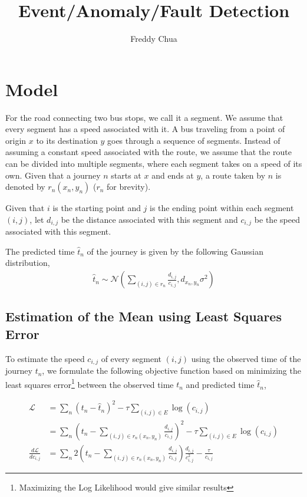 \documentclass[10pt]{article}
\begin{document}
\author{Freddy Chua}
\title{Event/Anomaly/Fault Detection}

\maketitle

\section{Model}

For the road connecting two bus stops, we call it a segment. We assume that every segment has a speed associated with it. A bus traveling from a point of origin $x$ to its destination $y$ goes through a sequence of segments. Instead of assuming a constant speed associated with the route, we assume that the route can be divided into multiple segments, where each segment takes on a speed of its own. Given that a journey $n$ starts at $x$ and ends at $y$, a route taken by $n$ is denoted by $r_n(x_n, y_n)$ ($r_n$ for brevity).

Given that $i$ is the starting point and $j$ is the ending point within each segment $(i, j)$, let $d_{i,j}$ be the distance associated with this segment and $c_{i,j}$ be the speed associated with this segment.

The predicted time $\hat{t}_n$ of the journey is given by the following Gaussian distribution,
\begin{gather}
\hat{t}_n \sim \mathcal{N} \left( \sum_{ (i,j) \in r_n } \frac{ d_{i,j} }{ c_{i,j} }, d_{x_n, y_n} \sigma^2 \right)
\end{gather}

\subsection{Estimation of the Mean using Least Squares Error}

To estimate the speed $c_{i,j}$ of every segment $(i,j)$ using the observed time of the journey $t_n$, we formulate the following objective function based on minimizing the least squares error\footnote{Maximizing the Log Likelihood would give similar results} between the observed time $t_n$ and predicted time $\hat{t}_n$,

\begin{align*}
\mathcal{L} &= \sum_{n} \left( t_n - \hat{t}_n \right)^2 - \tau \sum_{(i,j) \in E} \log(c_{i,j}) \\
&= \sum_{n} \left( t_n - \sum_{ (i,j) \in r_n(x_n, y_n) } \frac{d_{i,j}}{c_{i,j}} \right)^2 - \tau \sum_{(i,j) \in E} \log(c_{i,j}) \\
\frac{d \mathcal{L}}{d c_{i,j}} &= \sum_{n} 2 \left( t_n - \sum_{ (i,j) \in r_n(x_n, y_n) } \frac{d_{i,j}}{c_{i,j}} \right) \frac{d_{i,j}}{c_{i,j}^2} - \frac{\tau}{c_{i,j}}
\end{align*}
\end{document}
